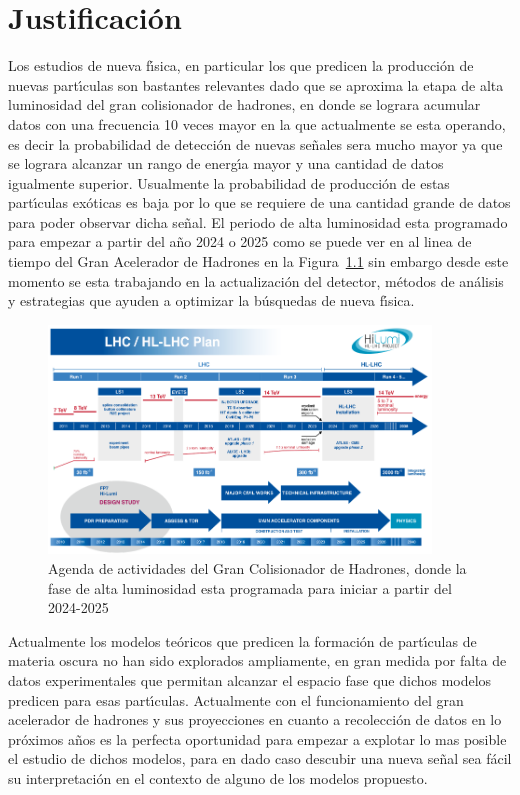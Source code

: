 \chapter{Justificaci\'on}

Los estudios de nueva f\'{\i}sica, en particular los que predicen la producci\'on de nuevas part\'{\i}culas son bastantes relevantes dado que se aproxima la etapa de alta luminosidad del gran colisionador de hadrones, en donde se lograra acumular datos con una frecuencia 10 veces mayor en la que actualmente se esta operando, es decir la probabilidad de detecci\'on de nuevas se\~nales sera mucho mayor ya que se lograra alcanzar un rango de energ\'{\i}a mayor y una cantidad de datos igualmente superior. Usualmente la probabilidad de producci\'on de estas part\'{\i}culas ex\'oticas es baja por lo que se requiere de una cantidad grande de datos para poder observar dicha se\~nal. El periodo de alta luminosidad esta programado para empezar a partir del a\~no 2024 o 2025 como se puede ver en al linea de tiempo del Gran Acelerador de Hadrones en la Figura~\ref{fig:lhctimeline} sin embargo desde este momento se esta trabajando en la actualizaci\'on del detector, m\'etodos de an\'alisis y estrategias que ayuden a optimizar la b\'usquedas de nueva f\'{\i}sica. 

\begin{figure}
\begin{center}
  \includegraphics[width=4.0in]{lhc_timeline.png}
  \caption{Agenda de actividades del Gran Colisionador de Hadrones, donde la fase de alta luminosidad esta programada para iniciar a partir del 2024-2025}
  \label{fig:lhctimeline}
\end{center}
\end{figure}


Actualmente los modelos te\'oricos que predicen la formaci\'on de part\'{\i}culas de materia oscura no han sido explorados ampliamente, en gran medida por falta de datos experimentales que permitan alcanzar el espacio fase que dichos modelos predicen para esas part\'{\i}culas.  Actualmente con el funcionamiento del gran acelerador de hadrones y sus proyecciones en cuanto a recolecci\'on de datos en lo pr\'oximos a\~nos es la perfecta oportunidad para empezar a explotar lo mas posible el estudio de dichos modelos, para en dado caso descubir una nueva se\~nal sea f\'acil su interpretaci\'on en el contexto de alguno de los modelos propuesto.


